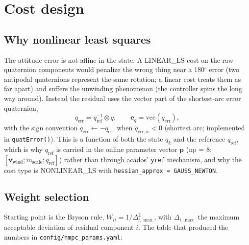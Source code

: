 \documentclass[11pt]{article}
\newcommand{\quatmul}{\otimes}
\begin{document}
\section{Cost design}
\label{sec:cost}

\subsection{Why nonlinear least squares}

The attitude error is not affine in the state. A LINEAR\_LS cost on the raw quaternion
components would penalize the wrong thing near a 180$^\circ$ error (two antipodal
quaternions represent the same rotation; a linear cost treats them as far apart) and suffers
the unwinding phenomenon (the controller spins the long way around). Instead the residual
uses the vector part of the shortest-arc error quaternion,
\begin{equation}
  q_{\mathrm{err}} = q_{\mathrm{ref}}^{-1} \quatmul q,
  \qquad
  \bm e_q = \mathrm{vec}(q_{\mathrm{err}}),
  \label{eq:eq}
\end{equation}
with the sign convention $q_{\mathrm{err}} \leftarrow -q_{\mathrm{err}}$ when
$q_{\mathrm{err},w} < 0$ (shortest arc; implemented in \texttt{quatError()}). This is a
function of both the state $q_k$ and the reference $q_{\mathrm{ref}}$, which is why
$q_{\mathrm{ref}}$ is carried in the online parameter vector $\bm p$ (np = 8:
$[\bm v_{\mathrm{wind}}; m_{\mathrm{scale}}; q_{\mathrm{ref}}]$) rather than through
acados' \texttt{yref} mechanism, and why the cost type is NONLINEAR\_LS with
\texttt{hessian\_approx = GAUSS\_NEWTON}.

\subsection{Weight selection}

Starting point is the Bryson rule, $W_{ii} = 1 / \Delta_{i,\max}^2$, with
$\Delta_{i,\max}$ the maximum acceptable deviation of residual component $i$. The table
that produced the numbers in \texttt{config/nmpc\_params.yaml}:
\end{document}
